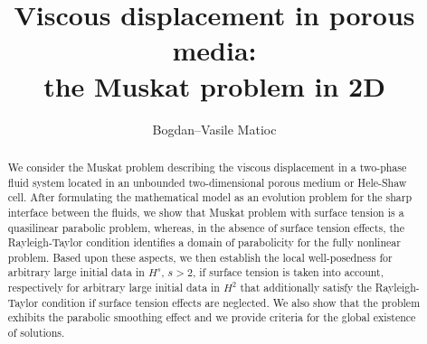 \documentclass[11pt,reqno]{amsart}
\title[The Muskat problem in 2D]{Viscous displacement in porous media: \\the Muskat problem in 2D}
\author[B.--V. Matioc]{Bogdan--Vasile Matioc}
\numberwithin{equation}{section}
\newcommand{\0}{\Omega}
\numberwithin{equation}{section}
\begin{document}
  
\begin{abstract}
We consider the Muskat problem describing the viscous displacement  in a two-phase fluid system located in an unbounded two-dimensional porous medium or Hele-Shaw cell. 
\mbox{After} formulating the mathematical model as an evolution problem for the sharp interface between the fluids, 
we show that Muskat problem with surface tension is a quasilinear parabolic problem, whereas, in the absence of surface tension effects, 
the Rayleigh-Taylor condition identifies a domain of parabolicity  for the fully nonlinear problem.
Based upon these aspects, we then establish  the local well-posedness for arbitrary large initial data in $H^s$, $s>2$, 
if surface tension is taken into account, respectively for arbitrary large initial data in $H^2$ that additionally satisfy
the Rayleigh-Taylor condition if surface tension effects are neglected. 
We also show that the problem exhibits the parabolic smoothing effect  and we provide criteria for the global existence of solutions. 
\end{abstract}



\maketitle

\tableofcontents
\end{document}
